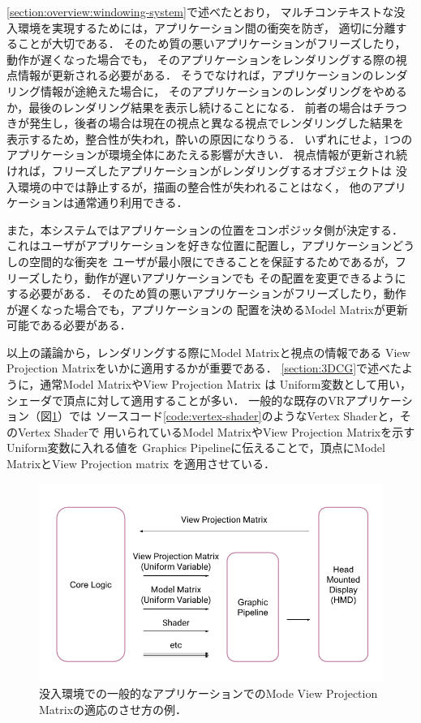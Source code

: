 \ref{section:overview:windowing-system}で述べたとおり，
マルチコンテキストな没入環境を実現するためには，アプリケーション間の衝突を防ぎ，
適切に分離することが大切である．
そのため質の悪いアプリケーションがフリーズしたり，動作が遅くなった場合でも，
そのアプリケーションをレンダリングする際の視点情報が更新される必要がある．
そうでなければ，アプリケーションのレンダリング情報が途絶えた場合に，
そのアプリケーションのレンダリングをやめるか，最後のレンダリング結果を表示し続けることになる．
前者の場合はチラつきが発生し，後者の場合は現在の視点と異なる視点でレンダリングした結果を
表示するため，整合性が失われ，酔いの原因になりうる．
いずれにせよ，1つのアプリケーションが環境全体にあたえる影響が大きい．
視点情報が更新され続ければ，フリーズしたアプリケーションがレンダリングするオブジェクトは
没入環境の中では静止するが，描画の整合性が失われることはなく，
他のアプリケーションは通常通り利用できる．

また，本システムではアプリケーションの位置をコンポジッタ側が決定する．
これはユーザがアプリケーションを好きな位置に配置し，アプリケーションどうしの空間的な衝突を
ユーザが最小限にできることを保証するためであるが，フリーズしたり，動作が遅いアプリケーションでも
その配置を変更できるようにする必要がある．
そのため質の悪いアプリケーションがフリーズしたり，動作が遅くなった場合でも，アプリケーションの
配置を決めるModel Matrixが更新可能である必要がある．

以上の議論から，レンダリングする際にModel Matrixと視点の情報である
View Projection Matrixをいかに適用するかが重要である．
\ref{section:3DCG}で述べたように，通常Model MatrixやView Projection Matrix は
Uniform変数として用い，シェーダで頂点に対して適用することが多い．
一般的な既存のVRアプリケーション（図\ref{fig:app-mvp}）では
ソースコード\ref{code:vertex-shader}のようなVertex Shaderと，そのVertex Shaderで
用いられているModel MatrixやView Projection Matrixを示すUniform変数に入れる値を
Graphics Pipelineに伝えることで，頂点にModel MatrixとView Projection matrix
を適用させている．

\begin{figure}[htbp]
  \centering
  \includegraphics[keepaspectratio, width=1\linewidth]{figures/app-mvp.png}
  \caption{
    没入環境での一般的なアプリケーションでのMode View Projection Matrixの適応のさせ方の例．
  }
  \label{fig:app-mvp}
\end{figure}

